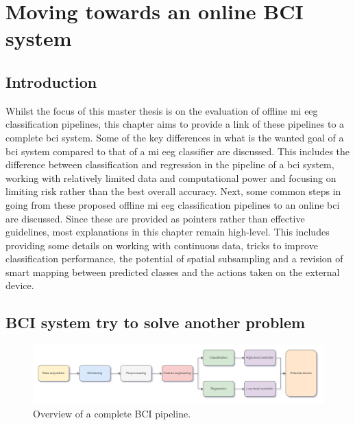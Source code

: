 \chapter{Moving towards an online BCI system}
\label{ch:online_bci_system}


\section{Introduction}
\label{sec:online_bci_system_introduction}

Whilst the focus of this master thesis is on the evaluation of offline \gls{mi} \gls{eeg} classification pipelines, this chapter aims to provide a link of these pipelines to a complete \gls{bci} system.
Some of the key differences in what is the wanted goal of a \gls{bci} system compared to that of a \gls{mi} \gls{eeg} classifier are discussed.
This includes the difference between classification and regression in the pipeline of a \gls{bci} system, working with relatively limited data and computational power and focusing on limiting risk rather than the best overall accuracy.
Next, some common steps in going from these proposed offline \gls{mi} \gls{eeg} classification pipelines to an online \gls{bci} are discussed.
Since these are provided as pointers rather than effective guidelines, most explanations in this chapter remain high-level.
This includes providing some details on working with continuous data, tricks to improve classification performance, the potential of spatial subsampling and a revision of smart mapping between predicted classes and the actions taken on the external device.


\section{BCI system try to solve another problem}
\label{sec:online_bci_system_different_goal}

\begin{figure}[t]
    \centering
    \includegraphics[width=\linewidth]{../images/online/bci_pipeline.pdf}
    \captionsetup{width=0.8\linewidth}
    \captionsetup{justification=centering}
    \caption{Overview of a complete BCI pipeline.}
    \label{fig:online_bci_system_full_bci_pipeline}
\end{figure}


